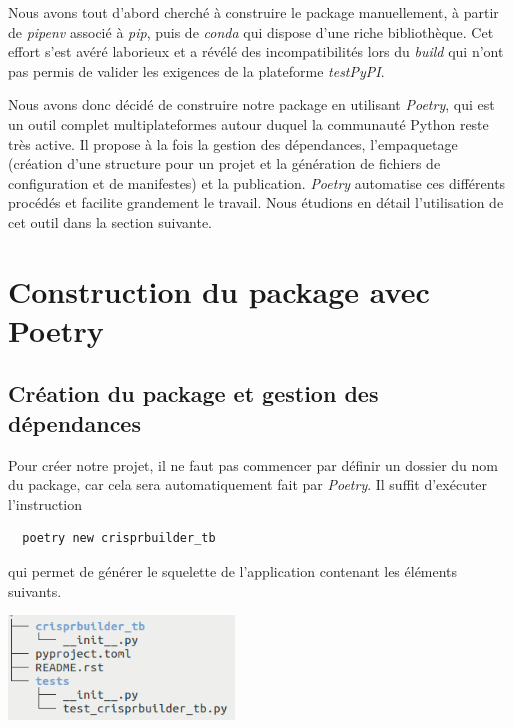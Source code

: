 \documentclass[twoside,a4paper,11pt,frenchb,openany]{report}
\begin{document}
Nous avons tout d'abord cherché à construire le package manuellement, à partir de \textit{pipenv} associé à \textit{pip}, puis de \textit{conda} qui dispose d'une riche bibliothèque. Cet effort s'est avéré laborieux et a révélé des incompatibilités lors du \textit{build} qui n'ont pas permis de valider les exigences de la plateforme \textit{testPyPI}.

Nous avons donc décidé de construire notre package en utilisant \textit{Poetry}, qui est un outil complet multiplateformes autour duquel la communauté Python reste très active. Il propose à la fois la gestion des dépendances, l'empaquetage (création d'une structure pour un projet et la génération de fichiers de configuration et de manifestes) et la publication. \textit{Poetry} automatise ces différents procédés et facilite grandement le travail. Nous étudions en détail l'utilisation de cet outil dans la section suivante.
	


\chapter{Construction du package avec Poetry}



\section{Création du package et gestion des dépendances}

Pour créer notre projet, il ne faut pas commencer par définir un dossier du nom du package, car cela sera automatiquement fait par \textit{Poetry}. Il suffit d'exécuter l'instruction

\begin{verbatim}
  poetry new crisprbuilder_tb
\end{verbatim}

qui permet de générer le squelette de l'application contenant les éléments suivants.

\includegraphics[width=6cm]{nom_package_tree.png}
\end{document}
